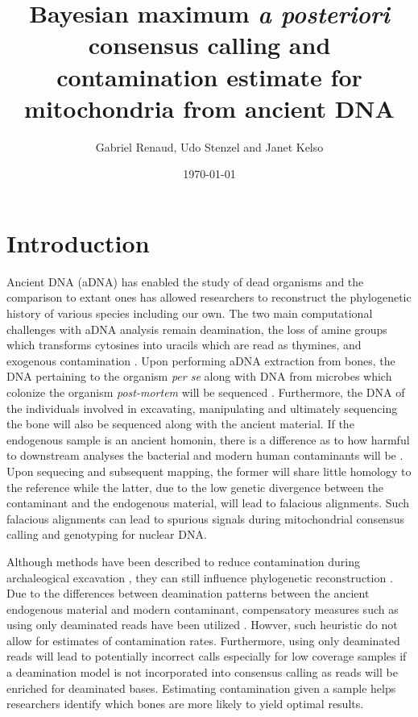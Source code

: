 \documentclass[a4paper,12pt]{article}
\begin{document}


\title{Bayesian maximum {\it a posteriori} consensus calling and contamination estimate for mitochondria from ancient DNA }
\date{\today}
\author{Gabriel Renaud, Udo Stenzel and Janet Kelso}


\maketitle

\section{Introduction}

Ancient DNA (aDNA) has enabled the study of dead organisms and the comparison to extant ones has allowed researchers to reconstruct the phylogenetic history of various species including our own. The two main computational challenges with aDNA analysis remain deamination, the loss of amine groups which transforms cytosines into uracils which are read as thymines, and exogenous contamination \cite{kay?}. Upon performing aDNA extraction from bones, the DNA pertaining to the organism {\it per se} along with DNA from microbes which colonize the organism {\it post-mortem} will be sequenced \cite{susanna?}. Furthermore, the DNA of the individuals involved in excavating, manipulating and ultimately sequencing the bone will also be sequenced along with the ancient material. If the endogenous sample is an ancient homonin, there is a difference as to how harmful to downstream analyses the bacterial and modern human contaminants will be . Upon sequecing and subsequent mapping, the former will share little homology to the reference while the latter, due to the low genetic divergence between the contaminant and the endogenous material, will lead to falacious alignments. Such falacious alignments can lead to spurious signals during mitochondrial consensus calling and genotyping for nuclear DNA. 

Although methods have been described to reduce contamination during archaleogical excavation \cite{yang2005contamination}, they can still influence phylogenetic reconstruction \cite{wall2007inconsistencies}. Due to the differences between deamination patterns between the ancient endogenous material and modern contaminant, compensatory measures such as using only deaminated reads have been utilized \cite{pontus}. Howver, such heuristic do not allow for estimates of contamination rates. Furthermore, using only deaminated reads will lead to potentially incorrect calls especially for low coverage samples if a deamination model is not incorporated into consensus calling as reads will be enriched for deaminated bases. Estimating contamination given a sample helps researchers identify which bones are more likely to yield optimal results. 
\end{document}
